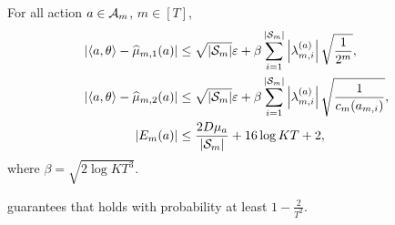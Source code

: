 \begin{event}\label{event:misLoss}
    For all action $a\in {\mathcal{A}}_m$, $m\in[T]$,
    \begin{align}
        \left|\left\langle {a,\theta} \right\rangle-\widehat{\mu}_{m,1}(a)\right|&\leq \sqrt{|{\mathcal{S}}_m|}\varepsilon + \beta\sum_{i=1}^{|{\mathcal{S}}_m|}\left|\lambda_{m,i}^{(a)}\right|\sqrt{\frac{1}{2^{m}}}, \label{eqn:concentr-1}\\
        \left|\left\langle {a,\theta} \right\rangle-\widehat{\mu}_{m,2}(a)\right|&\leq \sqrt{|{\mathcal{S}}_m|}\varepsilon +\beta \sum_{i=1}^{|{\mathcal{S}}_m|}\left|\lambda_{m,i}^{(a)}\right|\sqrt{\frac{1}{c_m(a_{m,i})}}, \label{eqn:concentr-2}\\
        |E_m(a)| &\leq \frac{2D\mu_a}{|{\mathcal{S}}_m|}+16\log KT+2,\label{eqn:concentr-3}
    \end{align}
    where $\beta = \sqrt{2\log KT^3}$.
\end{event}
\begin{lemma}\label{lem:high-prob-event}
     guarantees that  holds with probability at least $1-\frac{2}{T^2}$.
\end{lemma}

